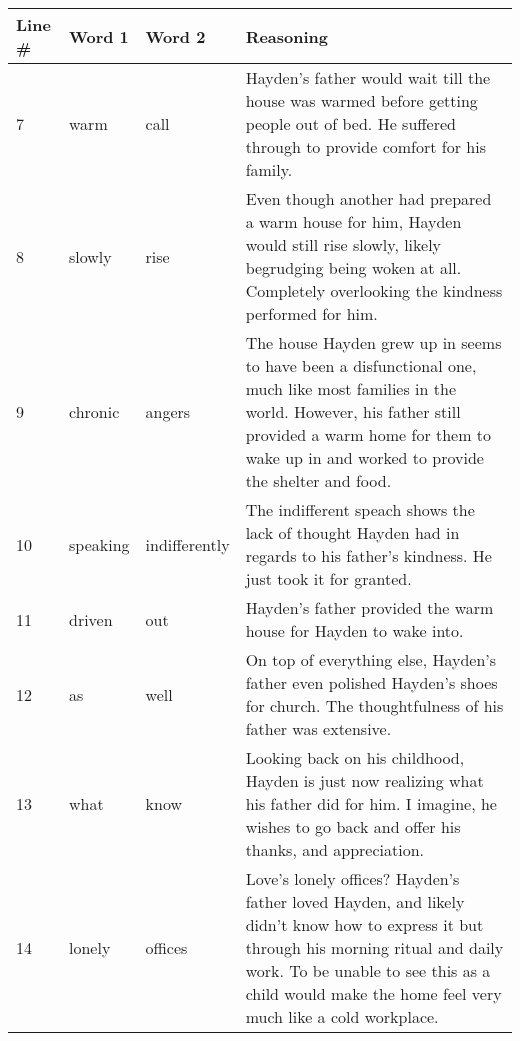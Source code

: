 \documentclass[a4paper,12pt]{article}
\begin{document}
\begin{center}
	\begin{tabular}{|l|l|l|p{2.5in}|}
	\hline
	Line \#& Word 1 & Word 2 & Reasoning \\ \hline
	7&warm&call&Hayden's father would wait till the house was warmed before getting people out of bed.  He suffered through to provide comfort for his family.\\ \hline
	8&slowly&rise&Even though another had prepared a warm house for him, Hayden would still rise slowly, likely begrudging being woken at all.  Completely overlooking the kindness performed for him.\\ \hline
	9&chronic&angers&The house Hayden grew up in seems to have been a disfunctional one, much like most families in the world.  However, his father still provided a warm home for them to wake up in and worked to provide the shelter and food.\\ \hline
	10&speaking&indifferently&The indifferent speach shows the lack of thought Hayden had in regards to his father's kindness.  He just took it for granted.\\ \hline
	11&driven&out&Hayden's father provided the warm house for Hayden to wake into.\\ \hline
	12&as&well&On top of everything else, Hayden's father even polished Hayden's shoes for church.  The thoughtfulness of his father was extensive.\\ \hline
	13&what&know&Looking back on his childhood, Hayden is just now realizing what his father did for him.  I imagine, he wishes to go back and offer his thanks, and appreciation.\\ \hline
	14&lonely&offices&Love's lonely offices?  Hayden's father loved Hayden, and likely didn't know how to express it but through his morning ritual and daily work.  To be unable to see this as a child would make the home feel very much like a cold workplace.\\ \hline
	\end{tabular}
\end{center}
\end{document}
